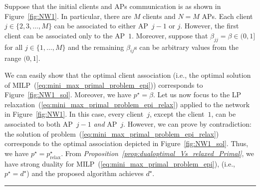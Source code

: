 \documentclass[journal, 10pt, twocolumn]{IEEEtran}
\newenvironment{Ex}
{\begin{adjustwidth}{0.04\linewidth}{0cm}
\begingroup\small
\vspace{-0.10em}
\raisebox{-.20em}{\rule{\linewidth}{0.3pt}}
\begin{example}
}
{
\end{example}
\vspace{-2mm}
\rule{\linewidth}{0.3pt}
\endgroup
\end{adjustwidth}}
\begin{document}
\begin{Ex}\label{ex:network1}
Suppose that the initial clients and APs communication is as shown in Figure~\ref{fig:NW1}. In particular, there are $M$ clients and $N=M$ APs. Each client $j\in\{2,3,\ldots,M\}$ can be associated to either AP~$j-1$ or $j$. However, the first client can be associated only to the AP~$1$. Moreover, suppose that $\beta_{jj}=\beta\in (0,1]$ for all $j\in\{1,\ldots,M\}$ and the remaining $\beta_{ij}$s can be arbitrary values from the range $(0,1]$.

We can easily show that the optimal client association (i.e., the optimal solution of MILP~(\ref{eq:mini_max_primal_problem_epi})) corresponds to Figure~\ref{fig:NW1_sol}. Moreover, we have $p^\star=\beta$. Let us now focus to the LP relaxation~(\ref{eq:mini_max_primal_problem_epi_relax}) applied to the network in Figure~\ref{fig:NW1}. In this case, every client~$j$, except the client~$1$, can be associated to both AP~$j-1$ \emph{and} AP~$j$. However, we can prove by contradiction: the solution of problem~(\ref{eq:mini_max_primal_problem_epi_relax}) corresponds to the optimal association depicted in Figure~\ref{fig:NW1_sol}. Thus, we have $p^\star=p^\star_{\mathrm{relax}}$. From \emph{Proposition~\ref{prop:dualoptimal_Vs_relaxed_Primal}}, we have strong duality for MILP~(\ref{eq:mini_max_primal_problem_epi}), (i.e., $p^\star=d^\star$) and the proposed algorithm achieves $d^\star$.
\end{Ex}
\end{document}
